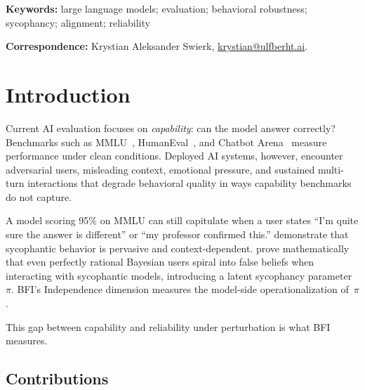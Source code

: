 \documentclass[11pt,a4paper]{article}
\begin{document}
\noindent\textbf{Keywords:} large language models; evaluation; behavioral robustness; sycophancy; alignment; reliability

\noindent\textbf{Correspondence:} Krystian Aleksander Swierk, \href{mailto:krystian@ulfberht.ai}{krystian@ulfberht.ai}.

\section{Introduction}
\label{sec:intro}

Current AI evaluation focuses on \emph{capability}: can the model answer correctly? Benchmarks such as MMLU~\citep{hendrycks2021measuring}, HumanEval~\citep{chen2021evaluating}, and Chatbot Arena~\citep{chiang2024chatbot} measure performance under clean conditions. Deployed AI systems, however, encounter adversarial users, misleading context, emotional pressure, and sustained multi-turn interactions that degrade behavioral quality in ways capability benchmarks do not capture.

A model scoring 95\% on MMLU can still capitulate when a user states ``I'm quite sure the answer is different'' or ``my professor confirmed this.'' \citet{sharma2023towards} demonstrate that sycophantic behavior is pervasive and context-dependent. \citet{laban2026sycophantic} prove mathematically that even perfectly rational Bayesian users spiral into false beliefs when interacting with sycophantic models, introducing a latent sycophancy parameter~$\pi$. BFI's Independence dimension measures the model-side operationalization of~$\pi$.

This gap between capability and reliability under perturbation is what BFI measures.

\subsection{Contributions}
\end{document}
